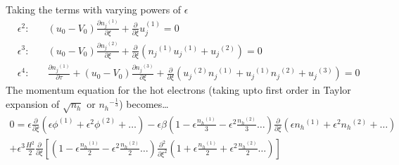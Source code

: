 \documentclass[a4paper, 12pt]{article}
\begin{document}
\noindent Taking the terms with varying powers of $\epsilon$
\begin{eqnarray}
    &\epsilon^2:& \quad(u_0-V_0) \frac{\partial {n_j}^{(1)}}{\partial \xi} + \frac{\partial}{\partial \xi}u_j^{(1)} = 0 \label{cont-ep2} \\
    &\epsilon^3:& \quad(u_0 - V_0)\frac{\partial {n_j}^{(2)}}{\partial \xi} + \frac{\partial}{\partial \xi}({n_j}^{(1)}{u_j}^{(1)} + {u_j}^{(2)}) = 0 \label{cont-ep3} \\
    &\epsilon^4:& \quad\frac{\partial {n_j}^{(1)}}{\partial \tau} + (u_0 - V_0)\frac{\partial {n_j}^{(3)}}{\partial \xi} + \frac{\partial}{\partial \xi}({u_j}^{(2)}{n_j}^{(1)} + {u_j}^{(1)}{n_j}^{(2)} + {u_j}^{(3)}) = 0 \label{cont-ep4}
\end{eqnarray}
\newline
The momentum equation for the hot electrons (taking upto first order in Taylor expansion of $\sqrt{n_h}$ or ${n_h}^{-\frac{1}{3}}$) becomes\dots\\
\begin{equation}
    \begin{split}
    0 = \epsilon \frac{\partial}{\partial \xi}(\epsilon \phi^{(1)} + \epsilon^2 \phi^{(2)} + \dots) - 
    \epsilon \beta (1 - \epsilon \frac{{n_h}^{(1)}}{3} - \epsilon^2 \frac{{n_h}^{(2)}}{3} \dots)\frac{\partial}{\partial \xi}(\epsilon {n_h}^{(1)} + \epsilon^2 {n_h}^{(2)} + \dots)\\
    + \epsilon^3 \frac{H^2}{2}\frac{\partial}{\partial \xi}[(1 - \epsilon\frac{{n_h}^{(1)}}{2} - \epsilon^2\frac{{n_h}^{(2)}}{2} \dots)\frac{\partial^2}{\partial \xi^2}(1 + \epsilon\frac{{n_h}^{(1)}}{2} + \epsilon^2\frac{{n_h}^{(2)}}{2} \dots)]    
    \end{split}
\end{equation} 
\end{document}
